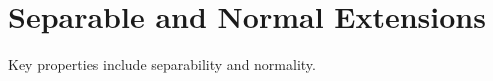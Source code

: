 \section{Separable and Normal Extensions}
\label{sec:separable-normal}

Key properties include separability and normality.

